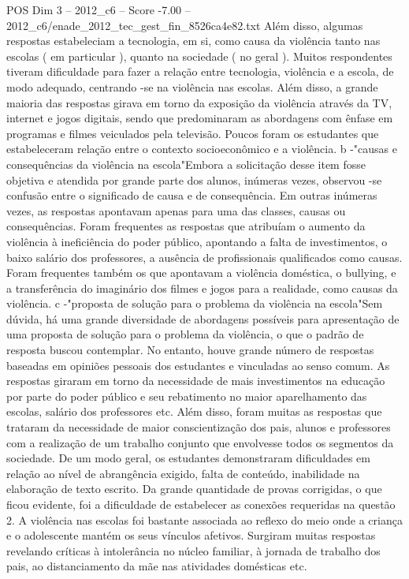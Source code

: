 \begin{textsample}{POS Dim 3 – 2012\_c6 – Score -7.00 – 2012\_c6/enade\_2012\_tec\_gest\_fin\_8526ca4e82.txt}
Além disso, algumas respostas estabeleciam a tecnologia, em si, como causa da violência tanto nas escolas ( em particular ), quanto na sociedade ( no geral ).
Muitos respondentes tiveram dificuldade para fazer a relação entre tecnologia, violência e a escola, de modo adequado, centrando -se na violência nas escolas.
Além disso, a grande maioria das respostas girava em torno da exposição da violência através da TV, internet e jogos digitais, sendo que predominaram as abordagens com ênfase em programas e filmes veiculados pela televisão.
Poucos foram os estudantes que estabeleceram relação entre o contexto socioeconômico e a violência. b -"causas e consequências da violência na escola"Embora a solicitação desse item fosse objetiva e atendida por grande parte dos alunos, inúmeras vezes, observou -se confusão entre o significado de causa e de consequência.
Em outras inúmeras vezes, as respostas apontavam apenas para uma das classes, causas ou consequências.
Foram frequentes as respostas que atribuíam o aumento da violência à ineficiência do poder público, apontando a falta de investimentos, o baixo salário dos professores, a ausência de profissionais qualificados como causas.
Foram frequentes também os que apontavam a violência doméstica, o bullying, e a transferência do imaginário dos filmes e jogos para a realidade, como causas da violência. c -"proposta de solução para o problema da violência na escola"Sem dúvida, há uma grande diversidade de abordagens possíveis para apresentação de uma proposta de solução para o problema da violência, o que o padrão de resposta buscou contemplar.
No entanto, houve grande número de respostas baseadas em opiniões pessoais dos estudantes e vinculadas ao senso comum.
As respostas giraram em torno da necessidade de mais investimentos na educação por parte do poder público e seu rebatimento no maior aparelhamento das escolas, salário dos professores etc.
Além disso, foram muitas as respostas que trataram da necessidade de maior conscientização dos pais, alunos e professores com a realização de um trabalho conjunto que envolvesse todos os segmentos da sociedade.
De um modo geral, os estudantes demonstraram dificuldades em relação ao nível de abrangência exigido, falta de conteúdo, inabilidade na elaboração de texto escrito.
Da grande quantidade de provas corrigidas, o que ficou evidente, foi a dificuldade de estabelecer as conexões requeridas na questão 2.
A violência nas escolas foi bastante associada ao reflexo do meio onde a criança e o adolescente mantém os seus vínculos afetivos.
Surgiram muitas respostas revelando críticas à intolerância no núcleo familiar, à jornada de trabalho dos pais, ao distanciamento da mãe nas atividades domésticas etc.

\end{textsample}
